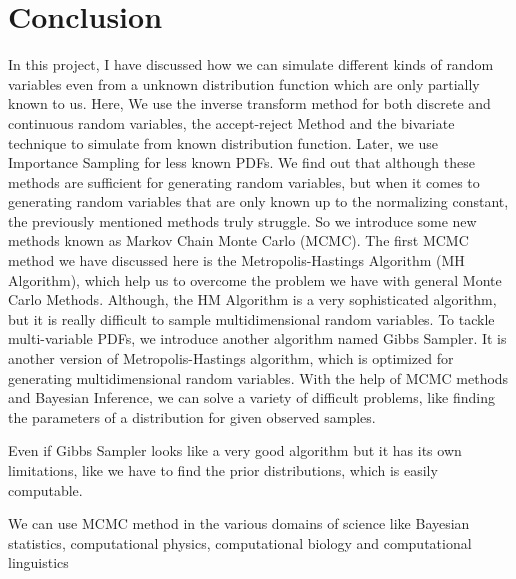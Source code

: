\chapter*{Conclusion}

In this project, I have discussed how we can simulate different kinds of random variables even from a unknown distribution function which are only partially known to us.
Here, We use the inverse transform method for both discrete and continuous random variables, the accept-reject Method and the bivariate technique to simulate from known distribution function. Later, we use Importance Sampling for less known PDFs. We find out that although these methods are sufficient for generating random variables,
but when it comes to generating random variables that are only known up to the normalizing constant, the previously mentioned methods truly struggle.
So we introduce some new methods known as Markov Chain Monte Carlo (MCMC).
The first MCMC method we have discussed here is the Metropolis-Hastings Algorithm (MH Algorithm), which help us to overcome the problem we have with general Monte Carlo Methods.
Although, the HM Algorithm is a very sophisticated algorithm, but it is really difficult to sample multidimensional random variables.
To tackle multi-variable PDFs, we introduce another algorithm named Gibbs Sampler.
It is another version of Metropolis-Hastings algorithm, which is optimized for generating multidimensional random variables.
With the help of MCMC methods and Bayesian Inference, we can solve a variety of difficult problems, like finding the parameters of a distribution for given observed samples.

Even if Gibbs Sampler looks like a very good algorithm but it has its own limitations, like we have to find the prior distributions, which is easily computable.

We can use MCMC method in the various domains of science like Bayesian statistics, computational physics, computational biology and computational linguistics
